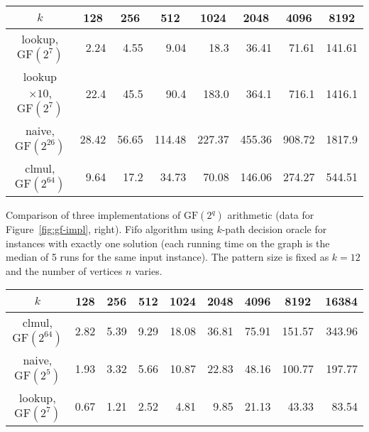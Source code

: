 \documentclass[11pt]{article}
\newcommand{\field}[1]{{\textrm{GF}}({#1})}
\begin{document}
{\scriptsize
\begin{center}
\begin{tabular}{|c|r|r|r|r|r|r|r|}\hline
\multicolumn{1}{|c|}{$k$} & \multicolumn{1}{|c|}{128}  & \multicolumn{1}{|c|}{256}  & \multicolumn{1}{|c|}{512}  & \multicolumn{1}{|c|}{1024}  & \multicolumn{1}{|c|}{2048}  & \multicolumn{1}{|c|}{4096}  & \multicolumn{1}{|c|}{8192} \\\hline
lookup, $\field{2^7}$ & 2.24 & 4.55 & 9.04 & 18.3 & 36.41 & 71.61 & 141.61\\
lookup $\times 10$, $\field{2^7}$ & 22.4 & 45.5 & 90.4 & 183.0 & 364.1 & 716.1 & 1416.1\\
naive, $\field{2^{26}}$ & 28.42 & 56.65 & 114.48 & 227.37 & 455.36 & 908.72 & 1817.9\\
clmul, $\field{2^{64}}$ & 9.64 & 17.2 & 34.73 & 70.08 & 146.06 & 274.27 & 544.51\\\hline
\end{tabular}
\end{center}
}


Comparison of three implementations of $\field{2^q}$ arithmetic (data for Figure~\ref{fig:gf-impl}, right).
Fifo algorithm using $k$-path decision oracle for instances with exactly one solution (each running time on the graph is the median of 5 runs for the same input instance). 
The pattern size is fixed as $k=12$ and the number of vertices $n$ varies.

{\scriptsize
\begin{center}
\begin{tabular}{|c|r|r|r|r|r|r|r|r|}\hline
\multicolumn{1}{|c|}{$k$} & \multicolumn{1}{|c|}{128}  & \multicolumn{1}{|c|}{256}  & \multicolumn{1}{|c|}{512}  & \multicolumn{1}{|c|}{1024}  & \multicolumn{1}{|c|}{2048}  & \multicolumn{1}{|c|}{4096}  & \multicolumn{1}{|c|}{8192}  & \multicolumn{1}{|c|}{16384} \\\hline
clmul, $\field{2^{64}}$ & 2.82 & 5.39 & 9.29 & 18.08 & 36.81 & 75.91 & 151.57 & 343.96\\
naive, $\field{2^{5}}$ & 1.93 & 3.32 & 5.66 & 10.87 & 22.83 & 48.16 & 100.77 & 197.77\\
lookup, $\field{2^7}$ & 0.67 & 1.21 & 2.52 & 4.81 & 9.85 & 21.13 & 43.33 & 83.54\\\hline
\end{tabular}
\end{center}
}
\end{document}

